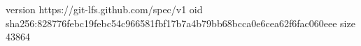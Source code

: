 version https://git-lfs.github.com/spec/v1
oid sha256:828776febc19febc54c966581fbf17b7a4b79bb68bcca0e6cea62f6fac060eee
size 43864
